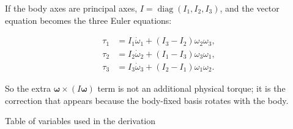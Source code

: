 \documentclass[a4paper,11pt]{article}
\begin{document}
If the body axes are principal axes, \(I=\operatorname{diag}(I_1,I_2,I_3)\),
and the vector equation becomes the three Euler equations:

\[
\begin{aligned}
\tau_1 &= I_1\dot\omega_1+(I_3-I_2)\omega_2\omega_3,\\
\tau_2 &= I_2\dot\omega_2+(I_1-I_3)\omega_3\omega_1,\\
\tau_3 &= I_3\dot\omega_3+(I_2-I_1)\omega_1\omega_2.
\end{aligned}
\]

So the extra \(\boldsymbol\omega\times(I\boldsymbol\omega)\) term is not an
additional physical torque; it is the correction that appears because the
body-fixed basis rotates with the body.

\hrulefill

Table of variables used in the derivation
\end{document}
